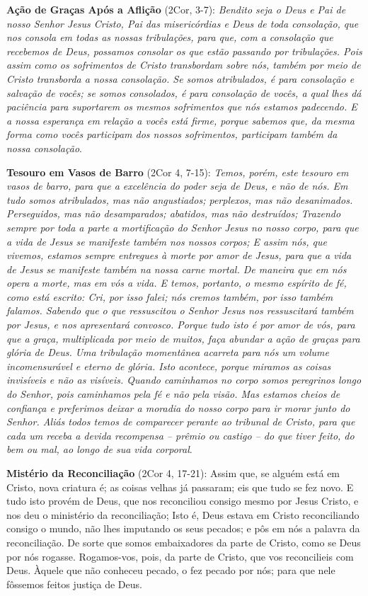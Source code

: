 \documentclass[
]{book}
\begin{document}
\textbf{Ação de Graças Após a Aflição} (2Cor, 3-7): \emph{Bendito seja o Deus e Pai de nosso Senhor Jesus Cristo, Pai das misericórdias e Deus de toda consolação, que nos consola em todas as nossas tribulações, para que, com a consolação que recebemos de Deus, possamos consolar os que estão passando por tribulações. Pois assim como os sofrimentos de Cristo transbordam sobre nós, também por meio de Cristo transborda a nossa consolação. Se somos atribulados, é para consolação e salvação de vocês; se somos consolados, é para consolação de vocês, a qual lhes dá paciência para suportarem os mesmos sofrimentos que nós estamos padecendo. E a nossa esperança em relação a vocês está firme, porque sabemos que, da mesma forma como vocês participam dos nossos sofrimentos, participam também da nossa consolação}.

\textbf{Tesouro em Vasos de Barro} (2Cor 4, 7-15): \emph{Temos, porém, este tesouro em vasos de barro, para que a excelência do poder seja de Deus, e não de nós. Em tudo somos atribulados, mas não angustiados; perplexos, mas não desanimados. Perseguidos, mas não desamparados; abatidos, mas não destruídos; Trazendo sempre por toda a parte a mortificação do Senhor Jesus no nosso corpo, para que a vida de Jesus se manifeste também nos nossos corpos; E assim nós, que vivemos, estamos sempre entregues à morte por amor de Jesus, para que a vida de Jesus se manifeste também na nossa carne mortal. De maneira que em nós opera a morte, mas em vós a vida. E temos, portanto, o mesmo espírito de fé, como está escrito: Cri, por isso falei; nós cremos também, por isso também falamos. Sabendo que o que ressuscitou o Senhor Jesus nos ressuscitará também por Jesus, e nos apresentará convosco. Porque tudo isto é por amor de vós, para que a graça, multiplicada por meio de muitos, faça abundar a ação de graças para glória de Deus. Uma tribulação momentânea acarreta para nós um volume incomensurável e eterno de glória. Isto acontece, porque miramos as coisas invisíveis e não as visíveis. Quando caminhamos no corpo somos peregrinos longo do Senhor, pois caminhamos pela fé e não pela visão. Mas estamos cheios de confiança e preferimos deixar a moradia do nosso corpo para ir morar junto do Senhor. Aliás todos temos de comparecer perante ao tribunal de Cristo, para que cada um receba a devida recompensa -- prêmio ou castigo -- do que tiver feito, do bem ou mal, ao longo de sua vida corporal}.

\textbf{Mistério da Reconciliação} (2Cor 4, 17-21): Assim que, se alguém está em Cristo, nova criatura é; as coisas velhas já passaram; eis que tudo se fez novo. E tudo isto provém de Deus, que nos reconciliou consigo mesmo por Jesus Cristo, e nos deu o ministério da reconciliação; Isto é, Deus estava em Cristo reconciliando consigo o mundo, não lhes imputando os seus pecados; e pôs em nós a palavra da reconciliação. De sorte que somos embaixadores da parte de Cristo, como se Deus por nós rogasse. Rogamos-vos, pois, da parte de Cristo, que vos reconcilieis com Deus. Àquele que não conheceu pecado, o fez pecado por nós; para que nele fôssemos feitos justiça de Deus.
\end{document}
